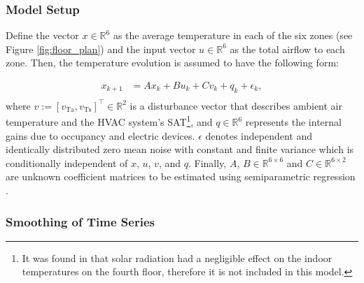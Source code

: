 
\subsubsection{Model Setup}

Define the vector $x \in \mathbb{R}^6$ as the average temperature in each of the six zones (see Figure \ref{fig:floor_plan}) and the input vector $u \in \mathbb{R}^6$ as the total airflow to each zone. Then, the temperature evolution is assumed to have the following form:

\begin{equation}
\begin{aligned}\label{eq:building_model}
x_{k+1} &= A x_k + B u_k + C v_k + q_k + \epsilon_k, \\
\end{aligned}
\end{equation}
where $v:= \left[ v_\text{Ta}, v_\text{Ts} \right]^\top \in \mathbb{R}^2$ is a disturbance vector that describes ambient air temperature and the HVAC system's SAT\footnote{It was found in \cite{Zhou:2017modelcomp} that solar radiation had a negligible effect on the indoor temperatures on the fourth floor, therefore it is not included in this model.}, and  $q \in \mathbb{R}^6$ represents the internal gains due to occupancy and electric devices.
$\epsilon$ denotes independent and identically distributed zero mean noise with constant and finite variance which is conditionally independent of $x$, $u$, $v$, and $q$. Finally, $A$, $B \in \mathbb{R}^{6\times6}$ and $C \in \mathbb{R}^{6\times2}$ are unknown coefficient matrices to be estimated using semiparametric regression \cite{Ruppert:2003aa, Hardle:2000aa}.


\subsubsection{Smoothing of Time Series}

